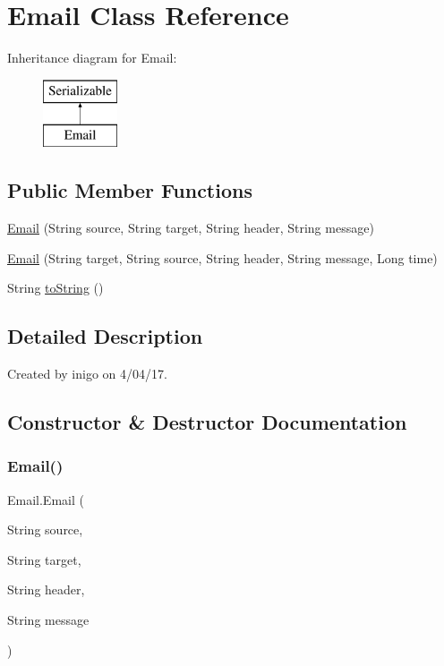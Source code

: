 \hypertarget{class_email}{}\section{Email Class Reference}
\label{class_email}
Inheritance diagram for Email\+:\begin{figure}[H]
\begin{center}
\leavevmode
\includegraphics[height=2.000000cm]{class_email}
\end{center}
\end{figure}
\subsection*{Public Member Functions}
\begin{DoxyCompactItemize}
\item 
\hyperlink{class_email_aeb3e50d5f8a615a8320d14f0b391f325}{Email} (String source, String target, String header, String message)
\item 
\hyperlink{class_email_ac5e2d95c5f91c21ecba14dc3db380f6a}{Email} (String target, String source, String header, String message, Long time)
\item 
String \hyperlink{class_email_ada3a942a6a2471322bf1fa6ab44e0dbd}{to\+String} ()
\end{DoxyCompactItemize}


\subsection{Detailed Description}
Created by inigo on 4/04/17. 

\subsection{Constructor \& Destructor Documentation}
\mbox{\label{class_email_aeb3e50d5f8a615a8320d14f0b391f325}} 
\subsubsection{\texorpdfstring{Email()}{Email()}\hspace{0.1cm}{\footnotesize\ttfamily [1/2]}}
{\footnotesize\ttfamily Email.\+Email (\begin{DoxyParamCaption}\item[{String}]{source,  }\item[{String}]{target,  }\item[{String}]{header,  }\item[{String}]{message }\end{DoxyParamCaption})}

